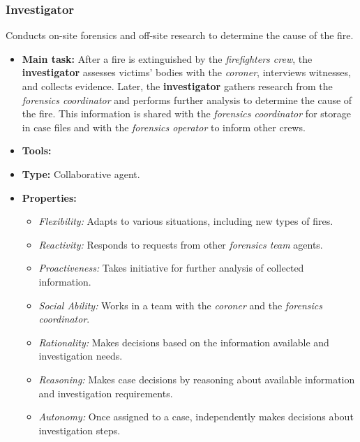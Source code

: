 \subsubsection{Investigator}
Conducts on-site forensics and off-site research to determine the cause of the fire.
\begin{itemize}
    \item \textbf{Main task:} After a fire is extinguished by the \textit{firefighters crew}, the \textbf{investigator} assesses victims' bodies with the \textit{coroner}, interviews witnesses, and collects evidence. Later, the \textbf{investigator} gathers research from the \textit{forensics coordinator} and performs further analysis to determine the cause of the fire. This information is shared with the \textit{forensics coordinator} for storage in case files and with the \textit{forensics operator} to inform other crews.
    \item \textbf{Tools:}
    \item \textbf{Type:} Collaborative agent.
    \item \textbf{Properties:}
    \begin{itemize}
        \item \textit{Flexibility:} Adapts to various situations, including new types of fires.
        \item \textit{Reactivity:} Responds to requests from other \textit{forensics team} agents.
        \item \textit{Proactiveness:} Takes initiative for further analysis of collected information.
        \item \textit{Social Ability:} Works in a team with the \textit{coroner} and the \textit{forensics coordinator}.
        \item \textit{Rationality:} Makes decisions based on the information available and investigation needs.
        \item \textit{Reasoning:} Makes case decisions by reasoning about available information and investigation requirements.
        \item \textit{Autonomy:} Once assigned to a case, independently makes decisions about investigation steps.
    \end{itemize}
\end{itemize}
